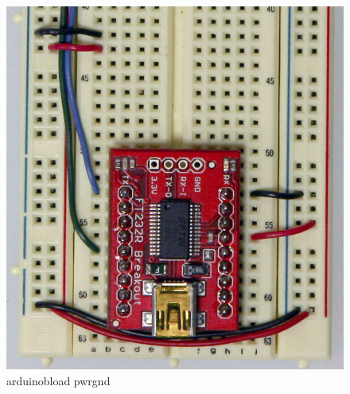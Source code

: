 \begin{figure}[!htb]
 \centering
 \includegraphics[scale=0.3]{img/arduino_breadboard/arduinobload_pwrgnd.jpg}
 \caption{arduinobload pwrgnd}
 \label{arduinobload pwrgnd}
\end{figure}


